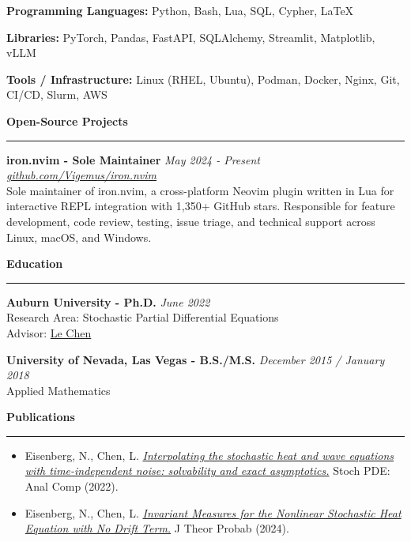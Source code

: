 \documentclass[11pt]{article}
\begin{document}
\textbf{Programming Languages:}
Python, Bash, Lua, SQL, Cypher, \LaTeX

\vspace{-.5em}

\textbf{Libraries:}
PyTorch, Pandas, FastAPI, SQLAlchemy, Streamlit, Matplotlib, vLLM

\vspace{-.5em}

\textbf{Tools / Infrastructure:}
Linux (RHEL, Ubuntu), Podman, Docker, Nginx, Git, CI/CD, Slurm, AWS

\textbf{\Large Open-Source Projects} \vspace{.2em} \hrule
\textbf{\large iron.nvim - Sole Maintainer}
\hfill \textit{May 2024 - Present}\\
\href{https://github.com/Vigemus/iron.nvim}
{\textit{github.com/Vigemus/iron.nvim}}\\
Sole maintainer of iron.nvim, a cross-platform Neovim plugin written in Lua for
interactive REPL integration with 1,350+ GitHub stars. Responsible for feature
development, code review, testing, issue triage, and technical support across
Linux, macOS, and Windows.

\textbf{\Large Education} \vspace{.2em} \hrule

\textbf{Auburn University - Ph.D.}
\hfill \textit{June 2022}\\
Research Area: Stochastic Partial Differential Equations\\
Advisor: \href{http://webhome.auburn.edu/~lzc0090/}{Le Chen}

\textbf{University of Nevada, Las Vegas - B.S./M.S.}
\hfill \textit{December 2015 / January 2018}\\
Applied Mathematics

\textbf{\Large Publications} \vspace{.2em} \hrule

\begin{itemize}[leftmargin=*,nosep]

  \item[1:]
    Eisenberg, N., Chen, L.
    \href{https://doi.org/10.1007/s40072-022-00258-6}
    {\textit{Interpolating the stochastic heat and wave equations with
    time-independent noise: solvability and exact asymptotics.}}
    Stoch PDE: Anal Comp (2022).

  \item[2:]
    Eisenberg, N., Chen, L.
    \href{https://doi.org/10.1007/s10959-023-01302-4}
    {\textit{Invariant Measures for the Nonlinear Stochastic Heat Equation
    with No Drift Term.}}
    J Theor Probab (2024).

\end{itemize}
\end{document}
